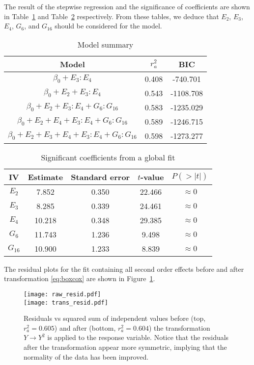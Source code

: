\documentclass[12pt, letterpaper]{article}
\begin{document}
The result of the stepwise regression and the significance of coefficients are shown in Table~\ref{tab:model_summary} and Table~\ref{tab:sig_coef} respectively. From these tables, we deduce that \(E_2\), \(E_3\), \(E_4\), \(G_6\), and \(G_{16}\) should be considered for the model.
\begin{table}
    \centering
    \caption{Model summary}
    \label{tab:model_summary}
    \begin{tabular}{c | c c}
        \hline\hline
        Model & \(r_a^2\) & BIC
        \\\hline
        \(\beta_0 + E_3:E_4\) & 0.408 & -740.701
        \\
        \(\beta_0 + E_2 + E_3:E_4\) & 0.543 & -1108.708
        \\
        \(\beta_0 + E_2 + E_3:E_4 + G_6:G_{16}\) & 0.583 & -1235.029
        \\
        \(\beta_0 + E_2 + E_4 + E_3:E_4 + G_6:G_{16}\) & 0.589 & -1246.715
        \\
        \(\beta_0 + E_2 + E_3 + E_4 + E_3:E_4 + G_6:G_{16}\) & 0.598 & -1273.277
        \\\hline\hline
    \end{tabular}
\end{table}
\begin{table}
    \centering
    \caption{Significant coefficients from a global fit}
    \label{tab:sig_coef}
    \begin{tabular}{c | c c c c}
        \hline\hline
        IV & Estimate & Standard error & \(t\)-value & \(P\left(>\left|t\right|\right)\)
        \\\hline
        \(E_2\) & 7.852 & 0.350 & 22.466 & \(\approx 0\)
        \\
        \(E_3\) & 8.285 & 0.339 & 24.461 & \(\approx 0\)
        \\
        \(E_4\) & 10.218 & 0.348 & 29.385 & \(\approx 0\)
        \\
        \(G_6\) & 11.743 & 1.236 & 9.498 & \(\approx 0\)
        \\
        \(G_{16}\) & 10.900 & 1.233 & 8.839 & \(\approx 0\)
        \\\hline\hline
    \end{tabular}
\end{table}

The residual plots for the fit containing all second order effects before and after transformation \eqref{eq:boxcox} are shown in Figure~\ref{fig:residuals}.
\begin{figure}
    \texttt{[image: raw\_resid.pdf]}
    \\
    \texttt{[image: trans\_resid.pdf]}
    \caption{
        Residuals vs squared sum of independent values before (top, \(r_a^2=0.605\)) and after (bottom, \(r_a^2=0.604\)) the transformation \(Y \rightarrow Y^2\) is applied to the response variable.
        Notice that the residuals after the transformation appear more symmetric, implying that the normality of the data has been improved.
    }
    \label{fig:residuals}
\end{figure}
\end{document}
